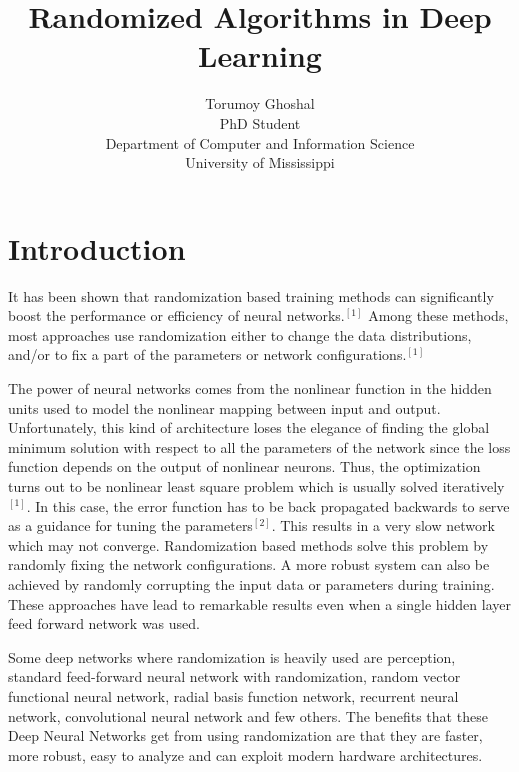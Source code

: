 \documentclass{article}
\begin{document}
\title{Randomized Algorithms in Deep Learning}

\author{Torumoy Ghoshal \\ PhD Student\\ Department of Computer and Information Science \\ University of Mississippi}
\maketitle

\section*{Introduction}

It has been shown that randomization based training methods can significantly boost the performance or efficiency of neural networks.$^{[1]}$ Among these methods, most approaches use randomization either to change the data distributions, and/or to fix a part of the parameters or network configurations.$^{[1]}$ 

The power of neural networks comes from the nonlinear function in the hidden units used to model the nonlinear mapping between input and output. Unfortunately, this kind of architecture loses the elegance of finding the global minimum solution with respect to all the parameters of the network since the loss function depends on the output of nonlinear neurons. Thus, the optimization turns out to be nonlinear least square problem which is usually solved iteratively$^{[1]}$. In this case, the error function has to be back propagated backwards to serve as a guidance for tuning the parameters$^{[2]}$. This results in a very slow network which may not converge. Randomization based methods solve this problem by randomly fixing the network configurations. A more robust system can also be achieved by randomly corrupting the input data or parameters during training. These approaches have lead to remarkable results even when a single hidden layer feed forward network was used. 

Some deep networks where randomization is heavily used are perception, standard feed-forward neural network with randomization, random vector functional neural network, radial basis function network, recurrent neural network, convolutional neural network and few others. The benefits that these Deep Neural Networks get from using randomization are that they are faster, more robust, easy to analyze and can exploit modern hardware architectures.
\end{document}
